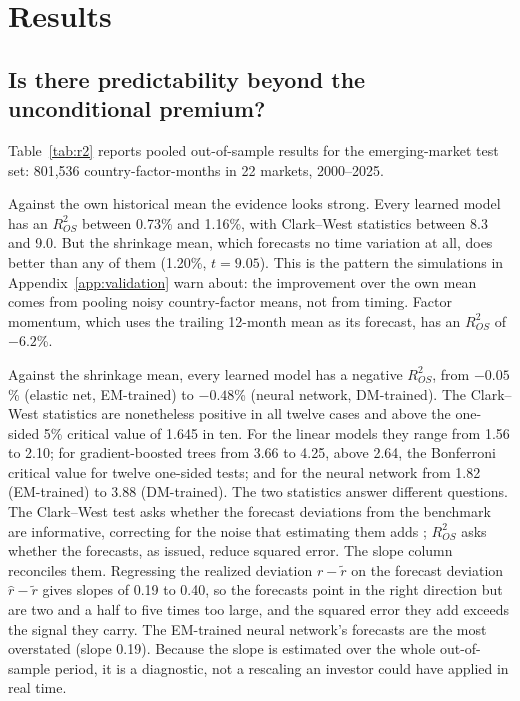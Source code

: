 \documentclass[11pt]{article}
\begin{document}
\section{Results}

\subsection{Is there predictability beyond the unconditional premium?}
Table~\ref{tab:r2} reports pooled out-of-sample results for the emerging-market test set: 801,536 country-factor-months in 22 markets, 2000--2025.

Against the own historical mean the evidence looks strong. Every learned model has an $R^2_{OS}$ between 0.73\% and 1.16\%, with Clark--West statistics between 8.3 and 9.0. But the shrinkage mean, which forecasts no time variation at all, does better than any of them (1.20\%, $t = 9.05$). This is the pattern the simulations in Appendix~\ref{app:validation} warn about: the improvement over the own mean comes from pooling noisy country-factor means, not from timing. Factor momentum, which uses the trailing 12-month mean as its forecast, has an $R^2_{OS}$ of $-6.2$\%.

Against the shrinkage mean, every learned model has a negative $R^2_{OS}$, from $-0.05$\% (elastic net, EM-trained) to $-0.48$\% (neural network, DM-trained). The Clark--West statistics are nonetheless positive in all twelve cases and above the one-sided 5\% critical value of 1.645 in ten. For the linear models they range from 1.56 to 2.10; for gradient-boosted trees from 3.66 to 4.25, above 2.64, the Bonferroni critical value for twelve one-sided tests; and for the neural network from 1.82 (EM-trained) to 3.88 (DM-trained). The two statistics answer different questions. The Clark--West test asks whether the forecast deviations from the benchmark are informative, correcting for the noise that estimating them adds \citep{clark2007approximately}; $R^2_{OS}$ asks whether the forecasts, as issued, reduce squared error. The slope column reconciles them. Regressing the realized deviation $r - \tilde r$ on the forecast deviation $\hat r - \tilde r$ gives slopes of 0.19 to 0.40, so the forecasts point in the right direction but are two and a half to five times too large, and the squared error they add exceeds the signal they carry. The EM-trained neural network's forecasts are the most overstated (slope 0.19). Because the slope is estimated over the whole out-of-sample period, it is a diagnostic, not a rescaling an investor could have applied in real time.
\end{document}
